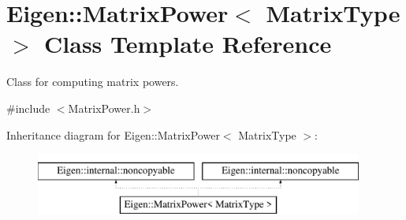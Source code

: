 \hypertarget{class_eigen_1_1_matrix_power}{}\section{Eigen\+:\+:Matrix\+Power$<$ Matrix\+Type $>$ Class Template Reference}
\label{class_eigen_1_1_matrix_power}


Class for computing matrix powers.  




{\ttfamily \#include $<$Matrix\+Power.\+h$>$}

Inheritance diagram for Eigen\+:\+:Matrix\+Power$<$ Matrix\+Type $>$\+:\begin{figure}[H]
\begin{center}
\leavevmode
\includegraphics[height=2.000000cm]{class_eigen_1_1_matrix_power}
\end{center}
\end{figure}

